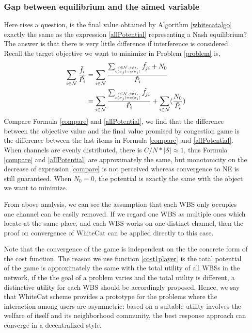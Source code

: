 \subsubsection*{Gap between equilibrium and the aimed variable}
Here rises a question, is the final value obtained by Algorithm \ref{whitecatalgo} exactly the same as the expression \ref{allPotential} representing a Nash equilibrium? The answer is that there is very little difference if interference is considered.
Recall the target objective we want to minimize in Problem \ref{problem} is,
\begin{equation}
\label{compare}
\begin{split}	
\sum_{i\in \mathcal{N}}\dfrac{\tilde{f_i}}{\tilde{P_i}}
& = \sum\limits_{i\in \mathcal{N}}\dfrac{\sum_{\tiny\substack{j\in \mathcal{N}, j\ne i,\\ c(\sigma_j)=c(\sigma_i)}}\tilde{f_{ji}}+N_0}{\tilde{P_i}}\\
& = \sum\limits_{i\in \mathcal{N}}\dfrac{\sum_{\tiny\substack{j\in \mathcal{N}, j\ne i,\\ c(\sigma_j)=c(\sigma_i)}}\tilde{f_{ji}}}{\tilde{P_i}} + \sum\limits_{i\in \mathcal{N}}  (\dfrac{N_0}{\tilde{P_i}})\\
\end{split}
\end{equation}
Compare Formula \ref{compare} and \ref{allPotential}, we find that the difference between the objective value and the final value promised by congestion game is the difference between the last items in Formula \ref{compare} and \ref{allPotential}. When channels are evenly distributed, there is $C/N*\mid \mathcal{S}\mid\approx 1$, thus Formula \ref{compare} and \ref{allPotential} are approximately the same, but monotonicity on the decrease of expression \ref{compare} is not perceived whereas convergence to NE is still guaranteed. When $N_0=0$, the potential is exactly the same with the object we want to minimize.

From above analysis, we can see the assumption that each WBS only occupies one channel can be easily removed.
If we regard one WBS as multiple ones which locate at the same place, and each WBS works on one distinct channel, then the proof on convergence of WhiteCat can be applied directly to this case.

Note that the convergence of the game is independent on the the concrete form of the cost function. The reason we use function \ref{cost1player} is the total potential of the game is approximately the same with the total utility of all WBSs in the network, if the the goal of a problem varies and the total utility is different, a distinctive utility for each WBS should be accordingly proposed. Hence, we say that WhiteCat scheme provides a prototype for the problems where the interaction among users are asymmetric: based on a suitable utility involves the welfare of itself and its neighborhood community, the best response approach can converge in a decentralized style.


